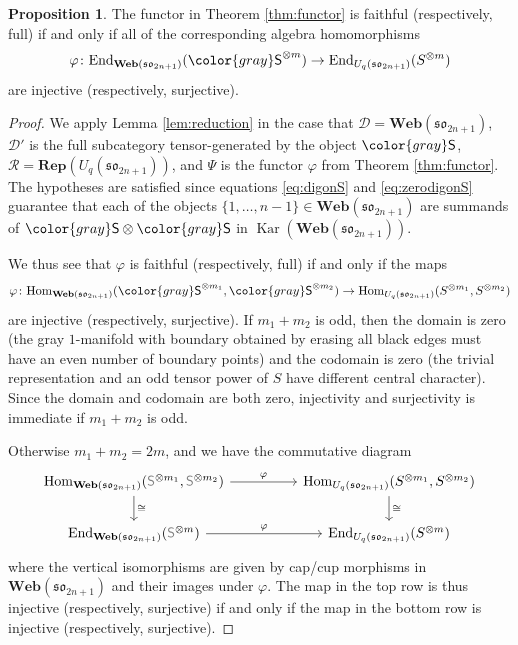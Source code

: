 \documentclass[10pt]{amsart}
\newcommand{\gray}[1]{{\color{gray}#1}}
\numberwithin{equation}{section}
\theoremstyle{definition}
\newtheorem{prop}[thm]{Proposition}
\newcommand{\Hom}{{\rm Hom}}
\newcommand{\End}{{\rm End}}
\renewcommand{\to}{\rightarrow}
\newcommand{\son}[1][2n+1]{\mathfrak{so}_{#1}}
\newcommand{\Rep}{\mathbf{Rep}}
\newcommand{\Web}{\mathbf{Web}}
\DeclareMathOperator{\Kar}{Kar}
\newcommand{\gS}{\gray{\mathsf{S}}}
\begin{document}
\begin{prop}\label{prop:FF}
The functor in Theorem \ref{thm:functor} is faithful (respectively, full) if and only if 
all of the corresponding algebra homomorphisms
\[
\varphi \colon \End_{\Web(\son)}(\gS^{\otimes m}) \to \End_{U_q(\son)}(S^{\otimes m})
	\]
are injective (respectively, surjective).
	\end{prop}
\begin{proof}
We apply Lemma \ref{lem:reduction} in the case that $\mathcal{D} = \Web(\son)$, 
$\mathcal{D}'$ is the full subcategory tensor-generated by the object $\gS$, 
$\mathcal{R} = \Rep(U_q(\son))$, and $\Psi$ is the functor $\varphi$ from Theorem \ref{thm:functor}.
The hypotheses are satisfied since equations \eqref{eq:digonS} and \eqref{eq:zerodigonS} 
guarantee that each of the objects $\{1,\ldots,n-1\} \in \Web(\son)$ are summands of $\gS \otimes \gS$ 
in $\Kar(\Web(\son))$.

We thus see that $\varphi$ is faithful (respectively, full) if and only if the maps
\[
\varphi \colon \Hom_{\Web(\son)}(\gS^{\otimes m_1},\gS^{\otimes m_2}) 
	\to \Hom_{U_q(\son)}(S^{\otimes m_1},S^{\otimes m_2})
	\]
are injective (respectively, surjective). If $m_1+m_2$ is odd, then the domain is zero 
(the gray $1$-manifold with boundary obtained by erasing all black edges 
must have an even number of boundary points) 
and the codomain is zero 
(the trivial representation and an odd tensor power of $S$ have different central character). 
Since the domain and codomain are both zero, injectivity and surjectivity is immediate if $m_1+m_2$ is odd. 

Otherwise $m_1+m_2=2m$, and we have the commutative diagram
\begin{equation}\label{eqn:monoidalduality}
\begin{tikzcd}
\Hom_{\Web(\son)}(\gS^{\otimes m_1},\gS^{\otimes m_2}) \ar[rr,"\varphi"] \ar[d,"\cong"]
& & \Hom_{U_q(\son)}(S^{\otimes m_1},S^{\otimes m_2}) \ar[d,"\cong"] \\
\End_{\Web(\son)}(\gS^{\otimes m}) \ar[rr,"\varphi"]
& & \End_{U_q(\son)}(S^{\otimes m})
	\end{tikzcd}
\end{equation}
where the vertical isomorphisms are given by cap/cup morphisms in $\Web(\son)$ 
and their images under $\varphi$. 
The map in the top row is thus injective (respectively, surjective)
if and only if the map in the bottom row is injective (respectively, surjective).
	\end{proof}
\end{document}

